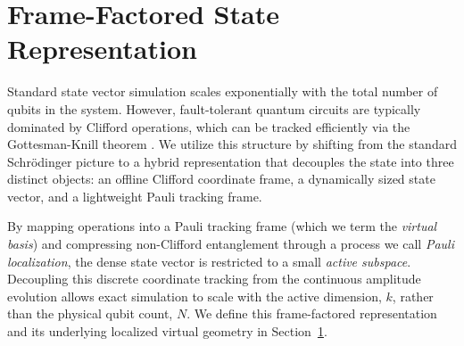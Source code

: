 \documentclass[a4paper, onecolumn, unpublished]{quantumarticle}
\begin{document}
    \section{Frame-Factored State Representation}
    \label{sec:theory}

    Standard state vector simulation scales exponentially with the total number of qubits in the system. However, fault-tolerant quantum circuits are typically dominated by Clifford operations, which can be tracked efficiently via the Gottesman-Knill theorem \cite{gottesman1998heisenbergrepresentationquantumcomputers}. We utilize this structure by shifting from the standard Schrödinger picture to a hybrid representation that decouples the state into three distinct objects: an offline Clifford coordinate frame, a dynamically sized state vector, and a lightweight Pauli tracking frame.

    By mapping operations into a Pauli tracking frame (which we term the \emph{virtual basis}) and compressing non-Clifford entanglement through a process we call \emph{Pauli localization}, the dense state vector is restricted to a small \emph{active subspace}. Decoupling this discrete coordinate tracking from the continuous amplitude evolution allows exact simulation to scale with the active dimension, $k$, rather than the physical qubit count, $N$. We define this frame-factored representation and its underlying localized virtual geometry in Section~\ref{sec:theory}.
\end{document}
